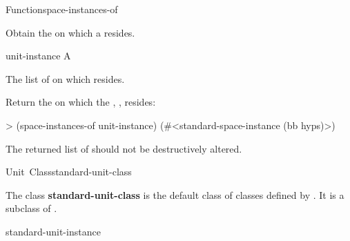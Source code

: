 \documentclass[10pt,twoside,english,pdftex]{article}
\begin{document}
\begin{functiondoc}{Function}{space-instances-of}%
  {
    \returns{} }
%
%

\fnsyntax

\fnpurpose Obtain the  on which a
 resides. 

\fnpackage {}

\fnmodule {}

\fnargs
\begin{args}{unit-instance}
 A 
\end{args}

\fnreturns The list of  on which
 resides.

\fnexample
Return the  on which the ,
, resides:
%
\W\supp
\begin{example}
> (space-instances-of unit-instance)
(#<standard-space-instance (bb hyps)>)
\end{example}

\fnnote The returned list of  should not be
destructively altered.

\end{functiondoc}


\begin{functiondoc}{Unit~Class}{standard-unit-class}{}
%
%

\fnsyntax

\fnpackage {}

\fnmodule {}

\fndescription 
{}%
The class \textbf{standard-unit-class} is the default class of classes defined
by \textbf{}.  It is a subclass of
.

\begin{alsos}{standard-unit-instance}
\end{alsos}

\end{functiondoc}
\end{document}
